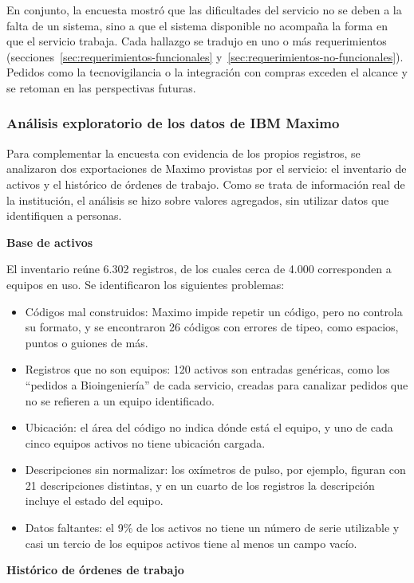 \documentclass[10pt]{article}
\begin{document}
En conjunto, la encuesta mostró que las dificultades del servicio no se deben a la falta de un sistema, sino a que el sistema disponible no acompaña la forma en que el servicio trabaja. Cada hallazgo se tradujo en uno o más requerimientos (secciones~\ref{sec:requerimientos-funcionales} y~\ref{sec:requerimientos-no-funcionales}). Pedidos como la tecnovigilancia o la integración con compras exceden el alcance y se retoman en las perspectivas futuras.

\subsubsection{Análisis exploratorio de los datos de IBM Maximo}
\label{sec:analisis-maximo}
Para complementar la encuesta con evidencia de los propios registros, se analizaron dos exportaciones de Maximo provistas por el servicio: el inventario de activos y el histórico de órdenes de trabajo. Como se trata de información real de la institución, el análisis se hizo sobre valores agregados, sin utilizar datos que identifiquen a personas.

\noindent\textbf {Base de activos}

El inventario reúne 6.302 registros, de los cuales cerca de 4.000 corresponden a equipos en uso. Se identificaron los siguientes problemas:
\begin{itemize}
    \item Códigos mal construidos: Maximo impide repetir un código, pero no controla su formato, y se encontraron 26 códigos con errores de tipeo, como espacios, puntos o guiones de más.
    \item Registros que no son equipos: 120 activos son entradas genéricas, como los “pedidos a Bioingeniería” de cada servicio, creadas para canalizar pedidos que no se refieren a un equipo identificado.
    \item Ubicación: el área del código no indica dónde está el equipo, y uno de cada cinco equipos activos no tiene ubicación cargada.
    \item Descripciones sin normalizar: los oxímetros de pulso, por ejemplo, figuran con 21 descripciones distintas, y en un cuarto de los registros la descripción incluye el estado del equipo.
    \item Datos faltantes: el 9\% de los activos no tiene un número de serie utilizable y casi un tercio de los equipos activos tiene al menos un campo vacío.
\end{itemize}
\textbf {Histórico de órdenes de trabajo}
\end{document}
